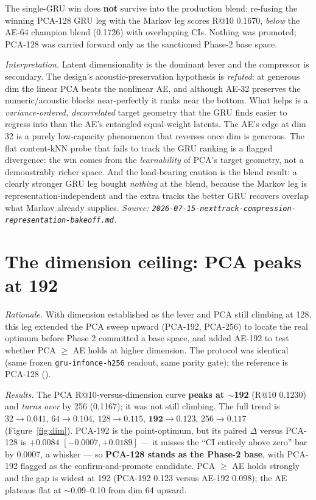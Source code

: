 \documentclass[11pt]{article}
\newcommand{\runid}[1]{\texttt{\small\seqsplit{#1}}}
\begin{document}
The single-GRU win does \textbf{not} survive into the production blend:
re-fusing the winning PCA-128 GRU leg with the Markov leg scores R@10
\num{0.1670}, \emph{below} the AE-64 champion blend (\num{0.1726}) with
overlapping CIs. Nothing was promoted; PCA-128 was carried forward only as the
sanctioned Phase-2 base space.

\emph{Interpretation.} Latent dimensionality is the dominant lever and the
compressor is secondary. The design's acoustic-preservation hypothesis is
\emph{refuted}: at generous dim the linear PCA beats the nonlinear AE, and
although AE-32 preserves the numeric/acoustic blocks near-perfectly it ranks near
the bottom. What helps is a \emph{variance-ordered, decorrelated} target geometry
that the GRU finds easier to regress into than the AE's entangled equal-weight
latents. The AE's edge at dim 32 is a purely low-capacity phenomenon that
reverses once dim is generous. The flat content-kNN probe that fails to track the
GRU ranking is a flagged divergence: the win comes from the \emph{learnability}
of PCA's target geometry, not a demonstrably richer space. And the load-bearing
caution is the blend result: a clearly stronger GRU leg bought \emph{nothing} at
the blend, because the Markov leg is representation-independent and the extra
tracks the better GRU recovers overlap what Markov already supplies.
\emph{Source:
\texttt{2026-07-15-nexttrack-compression-representation-bakeoff.md}.}

\section{The dimension ceiling: PCA peaks at 192}
\label{sec:dim}
\emph{Rationale.} With dimension established as the lever and PCA still climbing
at 128, this leg extended the PCA sweep upward (PCA-192, PCA-256) to locate the
real optimum before Phase 2 committed a base space, and added AE-192 to test
whether PCA $\ge$ AE holds at higher dimension. The protocol was identical (same
frozen \texttt{gru-infonce-h256} readout, same parity gate); the reference is
PCA-128 (\runid{run-20260715-042100-a1d9d}).

\emph{Results.} The PCA R@10-versus-dimension curve \textbf{peaks at $\sim$192}
(R@10 \num{0.1230}) and \emph{turns over} by 256 (\num{0.1167}); it was not still
climbing. The full trend is $32\!\to\!\num{0.041}$, $64\!\to\!\num{0.104}$,
$128\!\to\!\num{0.115}$, $\mathbf{192\!\to\!\num{0.123}}$, $256\!\to\!\num{0.117}$
(Figure~\ref{fig:dim}). PCA-192 is the point-optimum, but its paired $\Delta$
versus PCA-128 is $+\num{0.0084}$ $[-0.0007, +0.0189]$ --- it misses the ``CI
entirely above zero'' bar by \num{0.0007}, a whisker --- so \textbf{PCA-128
stands as the Phase-2 base}, with PCA-192 flagged as the confirm-and-promote
candidate. PCA $\ge$ AE holds strongly and the gap is widest at 192 (PCA-192
\num{0.123} versus AE-192 \num{0.098}); the AE plateaus flat at $\sim$0.09--0.10
from dim 64 upward.
\end{document}

